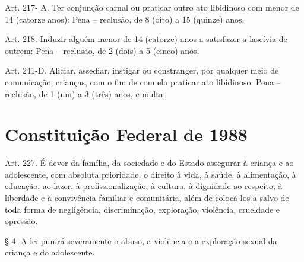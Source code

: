 Art. 217- A. Ter conjunção carnal ou praticar outro ato libidinoso com menor de 14 (catorze anos):
Pena – reclusão, de 8 (oito) a 15 (quinze) anos. 

Art. 218. Induzir alguém menor de 14 (catorze) anos a satisfazer a lascívia de outrem:
Pena – reclusão, de 2 (dois) a 5 (cinco) anos. 

Art. 241-D. Aliciar, assediar, instigar ou constranger, por qualquer meio de comunicação, crianças, com o fim de com ela praticar ato libidinoso:
Pena – reclusão, de 1 (um) a 3 (três) anos, e multa. 

\chapter{Constituição Federal de 1988}

Art. 227. É dever da família, da sociedade e do Estado assegurar à criança e ao adolescente, com absoluta prioridade, o direito à vida, à saúde, à alimentação, à educação, ao lazer, à profissionalização, à cultura, à dignidade ao respeito, à liberdade e à convivência familiar e comunitária, além de colocá-los a salvo de toda forma de negligência, discriminação, exploração, violência, crueldade e opressão. 

§ 4{\textordmasculine}. A lei punirá severamente o abuso, a violência e a exploração sexual da criança e do adolescente.